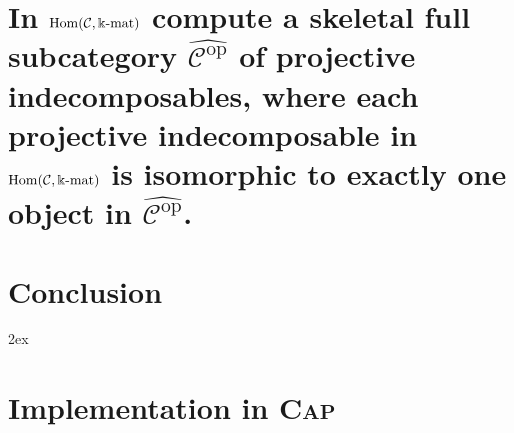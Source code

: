 \documentclass{article}
\begin{document}
\section{In $\mathrm{Hom}(\mathcal{C},\Bbbk\textnormal{-}\mathrm{mat})$ compute a skeletal full subcategory
$\widehat{\mathcal{C}^{\mathrm{op}}}$ of projective indecomposables,
where each projective indecomposable in $\mathrm{Hom}(\mathcal{C},\Bbbk\textnormal{-}\mathrm{mat})$ is isomorphic to exactly one
object in $\widehat{\mathcal{C}^{\mathrm{op}}}$.}


\section{Conclusion}


\begingroup
     \parindent 0pt
     \parskip 2ex
     \def\enotesize{\normalsize}
     \theendnotes
\endgroup 



\appendix
\renewcommand{\thesection}{\Alph{section}}
\section{Implementation in \textsc{Cap}}

\end{document}
